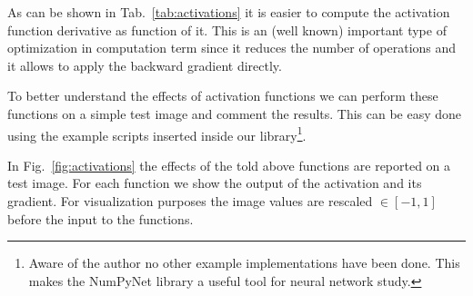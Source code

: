 \documentclass{standalone}
\begin{document}

As can be shown in Tab.~\ref{tab:activations} it is easier to compute the activation function derivative as function of it.
This is an (well known) important type of optimization in computation term since it reduces the number of operations and it allows to apply the backward gradient directly.

To better understand the effects of activation functions we can perform these functions on a simple test image and comment the results.
This can be easy done using the example scripts inserted inside our library\footnote{
  Aware of the author no other example implementations have been done.
  This makes the NumPyNet library a useful tool for neural network study.
}.

In Fig.~\ref{fig:activations} the effects of the told above functions are reported on a test image.
For each function we show the output of the activation and its gradient.
For visualization purposes the image values are rescaled $\in[-1, 1]$ before the input to the functions.




\end{document}

